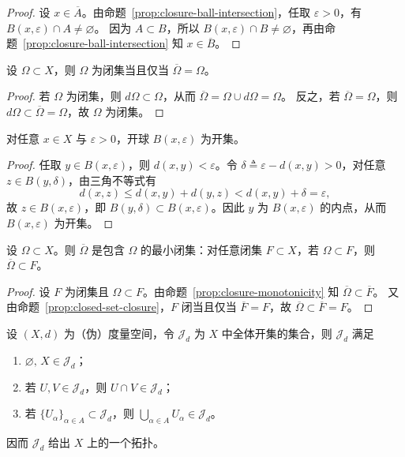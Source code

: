 \documentclass[lang=cn,a4paper,newtx,section]{elegantbook}
\begin{document}
\begin{proof}
  设 $x\in\overline{A}$。由命题~\ref{prop:closure-ball-intersection}，任取 $\varepsilon>0$，有 $B(x,\varepsilon)\cap A\ne\varnothing$。
  因为 $A\subset B$，所以 $B(x,\varepsilon)\cap B\ne\varnothing$，再由命题~\ref{prop:closure-ball-intersection} 知 $x\in\overline{B}$。
\end{proof}

\begin{proposition}\label{prop:closed-set-closure}
  设 $\Omega\subset X$，则 $\Omega$ 为闭集当且仅当 $\overline{\Omega}=\Omega$。
\end{proposition}

\begin{proof}
  若 $\Omega$ 为闭集，则 $d\Omega\subset\Omega$，从而 $\overline{\Omega}=\Omega\cup d\Omega=\Omega$。
  反之，若 $\overline{\Omega}=\Omega$，则 $d\Omega\subset\overline{\Omega}=\Omega$，故 $\Omega$ 为闭集。
\end{proof}

\begin{proposition}
  对任意 $x\in X$ 与 $\varepsilon>0$，开球 $B(x,\varepsilon)$ 为开集。
\end{proposition}

\begin{proof}
  任取 $y\in B(x,\varepsilon)$，则 $d(x,y)<\varepsilon$。令 $\delta\triangleq \varepsilon-d(x,y)>0$，对任意 $z\in B(y,\delta)$，由三角不等式有
  \[
    d(x,z)\le d(x,y)+d(y,z)<d(x,y)+\delta=\varepsilon,
  \]
  故 $z\in B(x,\varepsilon)$，即 $B(y,\delta)\subset B(x,\varepsilon)$。因此 $y$ 为 $B(x,\varepsilon)$ 的内点，从而 $B(x,\varepsilon)$ 为开集。
\end{proof}

\begin{proposition}
  设 $\Omega\subset X$。则 $\overline{\Omega}$ 是包含 $\Omega$ 的最小闭集：对任意闭集 $F\subset X$，若 $\Omega\subset F$，则 $\overline{\Omega}\subset F$。
\end{proposition}

\begin{proof}
  设 $F$ 为闭集且 $\Omega\subset F$。由命题~\ref{prop:closure-monotonicity} 知 $\overline{\Omega}\subset \overline{F}$。
  又由命题~\ref{prop:closed-set-closure}，$F$ 闭当且仅当 $\overline{F}=F$，故 $\overline{\Omega}\subset \overline{F}=F$。
\end{proof}

\begin{proposition}
  设 $(X,d)$ 为（伪）度量空间，令 $\mathcal{J}_d$ 为 $X$ 中全体开集的集合，则 $\mathcal{J}_d$ 满足
  \begin{enumerate}
    \item $\varnothing,\,X\in\mathcal{J}_d$；
    \item 若 $U,V\in\mathcal{J}_d$，则 $U\cap V\in\mathcal{J}_d$；
    \item 若 $\{U_\alpha\}_{\alpha\in A}\subset\mathcal{J}_d$，则 $\bigcup_{\alpha\in A}U_\alpha\in\mathcal{J}_d$。
  \end{enumerate}
  因而 $\mathcal{J}_d$ 给出 $X$ 上的一个拓扑。
\end{proposition}
\end{document}
